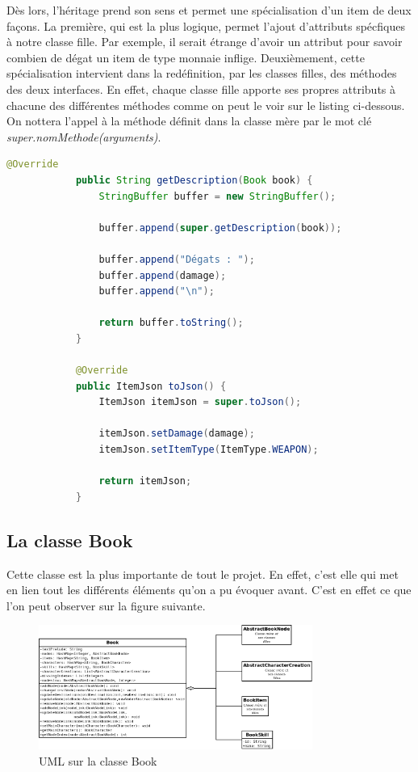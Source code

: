 			Dès lors, l'héritage prend son sens et permet une spécialisation d'un item de deux façons. La première, qui est la plus logique, permet l'ajout d'attributs spécfiques à notre classe fille. Par exemple, il serait étrange d'avoir un attribut pour savoir combien de dégat un item de type monnaie inflige. Deuxièmement, cette spécialisation intervient dans la redéfinition, par les classes filles, des méthodes des deux interfaces. En effet, chaque classe fille apporte ses propres attributs à chacune des différentes méthodes comme on peut le voir sur le listing ci-dessous. On nottera l'appel à la méthode définit dans la classe mère par le mot clé \textit{super.nomMethode(arguments)}.

			\begin{lstlisting}[gobble=12, language=Java, caption=Exemple de spécialisation des items]
			@Override
			public String getDescription(Book book) {
				StringBuffer buffer = new StringBuffer();

				buffer.append(super.getDescription(book));

				buffer.append("Dégats : ");
				buffer.append(damage);
				buffer.append("\n");

				return buffer.toString();
			}

			@Override
			public ItemJson toJson() {
				ItemJson itemJson = super.toJson();

				itemJson.setDamage(damage);
				itemJson.setItemType(ItemType.WEAPON);

				return itemJson;
			}
			\end{lstlisting}

		\subsection{La classe Book}\label{book}

			Cette classe est la plus importante de tout le projet. En effet, c'est elle qui met en lien tout les différents éléments qu'on a pu évoquer avant. C'est en effet ce que l'on peut observer sur la figure suivante.

			\begin{figure}[H]
				\centering\includegraphics[width=0.8\textwidth, keepaspectratio]{img/book.png}
				\caption{UML sur la classe Book}
			\end{figure}

